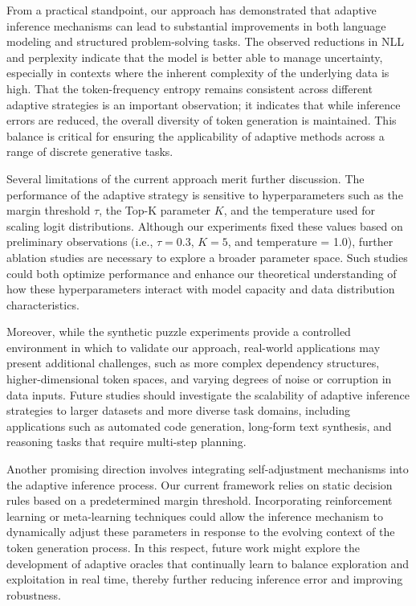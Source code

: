 \documentclass{article}
\begin{document}
From a practical standpoint, our approach has demonstrated that adaptive inference mechanisms can lead to substantial improvements in both language modeling and structured problem-solving tasks. The observed reductions in NLL and perplexity indicate that the model is better able to manage uncertainty, especially in contexts where the inherent complexity of the underlying data is high. That the token-frequency entropy remains consistent across different adaptive strategies is an important observation; it indicates that while inference errors are reduced, the overall diversity of token generation is maintained. This balance is critical for ensuring the applicability of adaptive methods across a range of discrete generative tasks.

Several limitations of the current approach merit further discussion. The performance of the adaptive strategy is sensitive to hyperparameters such as the margin threshold \(\tau\), the Top-K parameter \(K\), and the temperature used for scaling logit distributions. Although our experiments fixed these values based on preliminary observations (i.e., \(\tau = 0.3\), \(K = 5\), and temperature = 1.0), further ablation studies are necessary to explore a broader parameter space. Such studies could both optimize performance and enhance our theoretical understanding of how these hyperparameters interact with model capacity and data distribution characteristics.

Moreover, while the synthetic puzzle experiments provide a controlled environment in which to validate our approach, real-world applications may present additional challenges, such as more complex dependency structures, higher-dimensional token spaces, and varying degrees of noise or corruption in data inputs. Future studies should investigate the scalability of adaptive inference strategies to larger datasets and more diverse task domains, including applications such as automated code generation, long-form text synthesis, and reasoning tasks that require multi-step planning.

Another promising direction involves integrating self-adjustment mechanisms into the adaptive inference process. Our current framework relies on static decision rules based on a predetermined margin threshold. Incorporating reinforcement learning or meta-learning techniques could allow the inference mechanism to dynamically adjust these parameters in response to the evolving context of the token generation process. In this respect, future work might explore the development of adaptive oracles that continually learn to balance exploration and exploitation in real time, thereby further reducing inference error and improving robustness.
\end{document}
